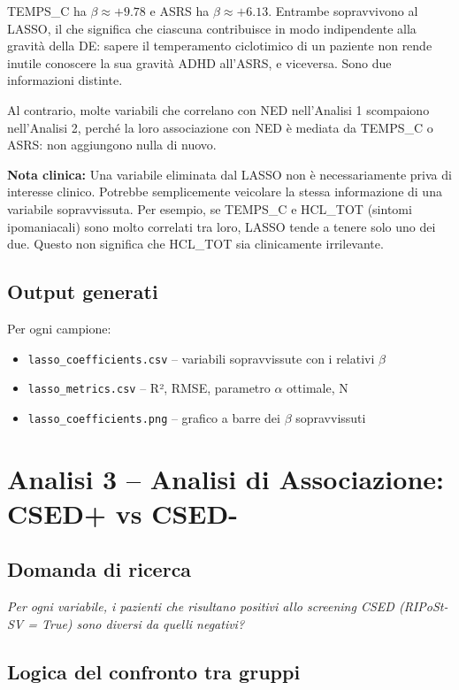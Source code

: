 \documentclass[12pt, a4paper]{article}
\newcommand{\nota}[1]{\vspace{0.4em}\noindent\colorbox{gray!15}{\parbox{\dimexpr\linewidth-2\fboxsep}{\small\textbf{Nota clinica:} #1}}\vspace{0.4em}}
\begin{document}
TEMPS\_C ha $\beta \approx +9.78$ e ASRS ha $\beta \approx +6.13$. Entrambe sopravvivono
al LASSO, il che significa che ciascuna contribuisce in modo indipendente alla gravità
della DE: sapere il temperamento ciclotimico di un paziente non rende inutile conoscere
la sua gravità ADHD all'ASRS, e viceversa. Sono due informazioni distinte.

Al contrario, molte variabili che correlano con NED nell'Analisi 1 scompaiono nell'Analisi 2,
perché la loro associazione con NED è mediata da TEMPS\_C o ASRS: non aggiungono nulla di
nuovo.

\nota{Una variabile eliminata dal LASSO non è necessariamente priva di interesse clinico.
Potrebbe semplicemente veicolare la stessa informazione di una variabile sopravvissuta.
Per esempio, se TEMPS\_C e HCL\_TOT (sintomi ipomaniacali) sono molto correlati tra loro,
LASSO tende a tenere solo uno dei due. Questo non significa che HCL\_TOT sia clinicamente
irrilevante.}

\subsection{Output generati}

Per ogni campione:
\begin{itemize}
    \item \texttt{lasso\_coefficients.csv} -- variabili sopravvissute con i relativi $\beta$
    \item \texttt{lasso\_metrics.csv} -- R², RMSE, parametro $\alpha$ ottimale, N
    \item \texttt{lasso\_coefficients.png} -- grafico a barre dei $\beta$ sopravvissuti
\end{itemize}

\section{Analisi 3 -- Analisi di Associazione: CSED+ vs CSED-}

\subsection{Domanda di ricerca}

\textit{Per ogni variabile, i pazienti che risultano positivi allo screening CSED (RIPoSt-SV
= True) sono diversi da quelli negativi?}

\subsection{Logica del confronto tra gruppi}
\end{document}
